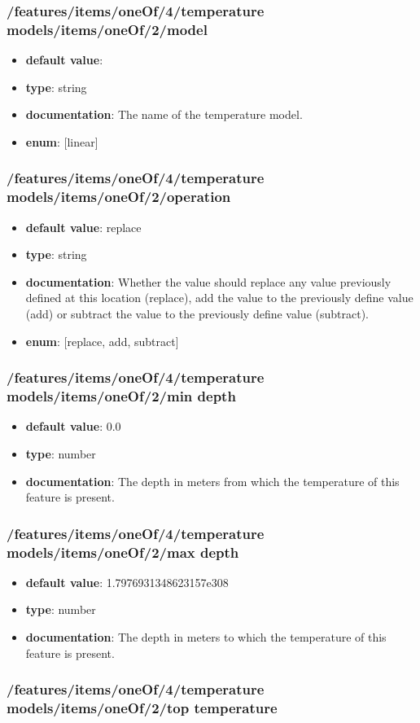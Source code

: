 \subsubsection{/features/items/oneOf/4/temperature models/items/oneOf/2/model}
\begin{itemize}\item {\bf default value}: 
\item {\bf type}: string
\item {\bf documentation}: The name of the temperature model.
\item {\bf enum}: [linear]\end{itemize}\subsubsection{/features/items/oneOf/4/temperature models/items/oneOf/2/operation}
\begin{itemize}\item {\bf default value}: replace
\item {\bf type}: string
\item {\bf documentation}: Whether the value should replace any value previously defined at this location (replace), add the value to the previously define value (add) or subtract the value to the previously define value (subtract).
\item {\bf enum}: [replace, add, subtract]\end{itemize}\subsubsection{/features/items/oneOf/4/temperature models/items/oneOf/2/min depth}
\begin{itemize}\item {\bf default value}: 0.0
\item {\bf type}: number
\item {\bf documentation}: The depth in meters from which the temperature of this feature is present.
\end{itemize}\subsubsection{/features/items/oneOf/4/temperature models/items/oneOf/2/max depth}
\begin{itemize}\item {\bf default value}: 1.7976931348623157e308
\item {\bf type}: number
\item {\bf documentation}: The depth in meters to which the temperature of this feature is present.
\end{itemize}\subsubsection{/features/items/oneOf/4/temperature models/items/oneOf/2/top temperature}
